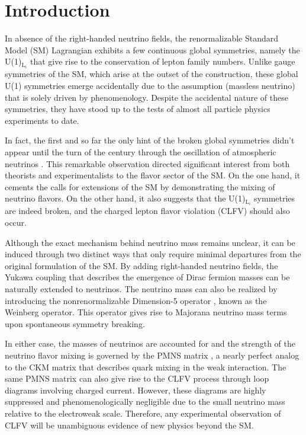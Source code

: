 \chapter{Introduction}
\label{chap:Introduction}

In absence of the right-handed neutrino fields, the renormalizable Standard Model (SM) Lagrangian exhibits a few continuous global symmetries, namely the U(1)$_{\text{L}_{i}}$ that give rise to the conservation of lepton family numbers. Unlike gauge symmetries of the SM, which arise at the outset of the construction, these global U(1) symmetries emerge accidentally due to the assumption (massless neutrino) that is solely driven by phenomenology. Despite the accidental nature of these symmetries, they have stood up to the tests of almost all particle physics experiments to date.  

In fact, the first and so far the only hint of the broken global symmetries didn't appear until the turn of the century through the oscillation of atmospheric neutrinos \cite{Super-Kamiokande:1998kpq,SNO:2002tuh}. This remarkable observation directed significant interest from both theorists and experimentalists to the flavor sector of the SM. On the one hand, it cements the calls for extensions of the SM by demonstrating the mixing of neutrino flavors. On the other hand, it also suggests that the U(1)$_{\text{L}_{i}}$ symmetries are indeed broken, and the charged lepton flavor violation (CLFV) should also occur. 

Although the exact mechanism behind neutrino mass remains unclear, it can be induced through two distinct ways that only require minimal departures from the original formulation of the SM. By adding right-handed neutrino fields, the Yukawa coupling \cite{PhysRevLett.19.1264} that describes the emergence of Dirac fermion masses can be naturally extended to neutrinos. The neutrino mass can also be realized by introducing the nonrenormalizable Dimension-5 operator \cite{Weinberg:1979sa}, known as the Weinberg operator. This operator gives rise to Majorana neutrino mass terms upon spontaneous symmetry breaking. 

In either case, the masses of neutrinos are accounted for and the strength of the neutrino flavor mixing is governed by the PMNS matrix \cite{Pontecorvo:1957cp,Maki:1962mu}, a nearly perfect analog to the CKM matrix \cite{Cabibbo:1963yz,Kobayashi:1973fv} that describes quark mixing in the weak interaction. The same PMNS matrix can also give rise to the CLFV process through loop diagrams involving charged current. However, these diagrams are highly suppressed and phenomenologically negligible due to the small neutrino mass relative to the electroweak scale. Therefore, any experimental observation of CLFV will be unambiguous evidence of new physics beyond the SM.

